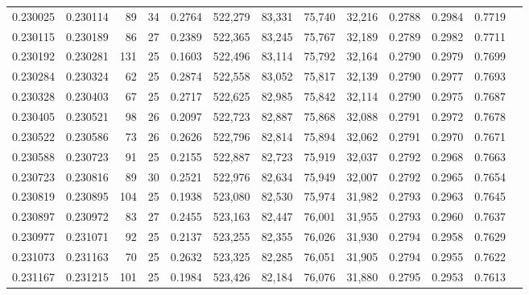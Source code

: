 \begin{tabular}{rrrrrrrrrrrrr}
0.230025 & 0.230114 &  89 &  34 &                                     0.2764 & 522,279 &  83,331 &  75,740 &  32,216 & 0.2788 & 0.2984 & 0.7719 \\
0.230115 & 0.230189 &  86 &  27 &                                     0.2389 & 522,365 &  83,245 &  75,767 &  32,189 & 0.2789 & 0.2982 & 0.7711 \\
0.230192 & 0.230281 & 131 &  25 &                                     0.1603 & 522,496 &  83,114 &  75,792 &  32,164 & 0.2790 & 0.2979 & 0.7699 \\
0.230284 & 0.230324 &  62 &  25 &                                     0.2874 & 522,558 &  83,052 &  75,817 &  32,139 & 0.2790 & 0.2977 & 0.7693 \\
0.230328 & 0.230403 &  67 &  25 &                                     0.2717 & 522,625 &  82,985 &  75,842 &  32,114 & 0.2790 & 0.2975 & 0.7687 \\
0.230405 & 0.230521 &  98 &  26 &                                     0.2097 & 522,723 &  82,887 &  75,868 &  32,088 & 0.2791 & 0.2972 & 0.7678 \\
0.230522 & 0.230586 &  73 &  26 &                                     0.2626 & 522,796 &  82,814 &  75,894 &  32,062 & 0.2791 & 0.2970 & 0.7671 \\
0.230588 & 0.230723 &  91 &  25 &                                     0.2155 & 522,887 &  82,723 &  75,919 &  32,037 & 0.2792 & 0.2968 & 0.7663 \\
0.230723 & 0.230816 &  89 &  30 &                                     0.2521 & 522,976 &  82,634 &  75,949 &  32,007 & 0.2792 & 0.2965 & 0.7654 \\
0.230819 & 0.230895 & 104 &  25 &                                     0.1938 & 523,080 &  82,530 &  75,974 &  31,982 & 0.2793 & 0.2963 & 0.7645 \\
0.230897 & 0.230972 &  83 &  27 &                                     0.2455 & 523,163 &  82,447 &  76,001 &  31,955 & 0.2793 & 0.2960 & 0.7637 \\
0.230977 & 0.231071 &  92 &  25 &                                     0.2137 & 523,255 &  82,355 &  76,026 &  31,930 & 0.2794 & 0.2958 & 0.7629 \\
0.231073 & 0.231163 &  70 &  25 &                                     0.2632 & 523,325 &  82,285 &  76,051 &  31,905 & 0.2794 & 0.2955 & 0.7622 \\
0.231167 & 0.231215 & 101 &  25 &                                     0.1984 & 523,426 &  82,184 &  76,076 &  31,880 & 0.2795 & 0.2953 & 0.7613 \\

\end{tabular}
